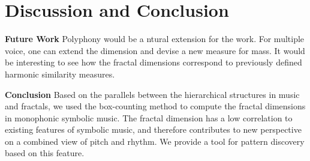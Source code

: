 
\section{Discussion and Conclusion}
 


\textbf{Future Work}
Polyphony would be a ntural extension for the work. 
For multiple voice, one can extend the dimension and devise a new measure for mass. 
It would be interesting to see how the fractal dimensions correspond to previously defined harmonic similarity measures. 

\textbf{Conclusion}
Based on the parallels between the hierarchical structures in music and fractals, we used the box-counting method to compute the fractal dimensions in monophonic symbolic music.
The fractal dimension has a low correlation to existing features of symbolic music, and therefore contributes to new perspective on a combined view of pitch and rhythm.
We provide a tool for pattern discovery based on this feature. 


